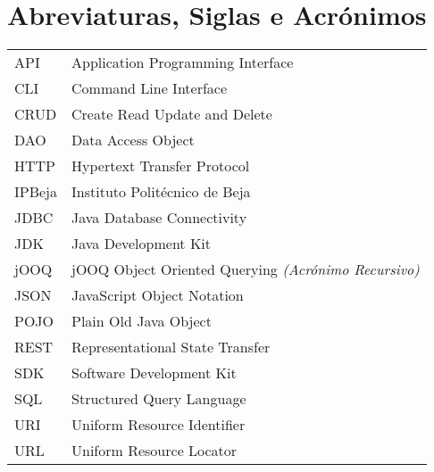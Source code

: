 \chapter{Abreviaturas, Siglas e Acrónimos}

\begin{longtable}{p{} p{}}

  API    & Application Programming Interface                           \\
  CLI    & Command Line Interface                                      \\
  CRUD   & Create Read Update and Delete                               \\
  DAO    & Data Access Object                                          \\
  HTTP   & Hypertext Transfer Protocol                                 \\
  IPBeja & Instituto Politécnico de Beja                               \\
  JDBC   & Java Database Connectivity                                  \\
  JDK    & Java Development Kit                                        \\
  jOOQ   & jOOQ Object Oriented Querying \textit{(Acrónimo Recursivo)} \\
  JSON   & JavaScript Object Notation                                  \\
  POJO   & Plain Old Java Object                                       \\
  REST   & Representational State Transfer                             \\
  SDK    & Software Development Kit                                    \\
  SQL    & Structured Query Language                                   \\
  URI    & Uniform Resource Identifier                                 \\
  URL    & Uniform Resource Locator
\end{longtable}
